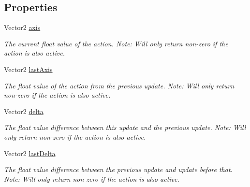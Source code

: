 \subsection*{Properties}
\begin{DoxyCompactItemize}
\item 
Vector2 \mbox{\hyperlink{interface_valve_1_1_v_r_1_1_i_steam_v_r___action___vector2_a90a192dee01024a2a0eaffe6d652f9d6}{axis}}
\begin{DoxyCompactList}\small\item\em The current float value of the action. Note\+: Will only return non-\/zero if the action is also active. \end{DoxyCompactList}\item 
Vector2 \mbox{\hyperlink{interface_valve_1_1_v_r_1_1_i_steam_v_r___action___vector2_aac73e1bef5867421fcba37e80d6cb18b}{last\+Axis}}
\begin{DoxyCompactList}\small\item\em The float value of the action from the previous update. Note\+: Will only return non-\/zero if the action is also active. \end{DoxyCompactList}\item 
Vector2 \mbox{\hyperlink{interface_valve_1_1_v_r_1_1_i_steam_v_r___action___vector2_aba4ebd5aa9cd8f26fd28c1a01dc5d327}{delta}}
\begin{DoxyCompactList}\small\item\em The float value difference between this update and the previous update. Note\+: Will only return non-\/zero if the action is also active. \end{DoxyCompactList}\item 
Vector2 \mbox{\hyperlink{interface_valve_1_1_v_r_1_1_i_steam_v_r___action___vector2_a702b333f19104d4390a85d3e2f114b3e}{last\+Delta}}
\begin{DoxyCompactList}\small\item\em The float value difference between the previous update and update before that. Note\+: Will only return non-\/zero if the action is also active. \end{DoxyCompactList}\end{DoxyCompactItemize}


